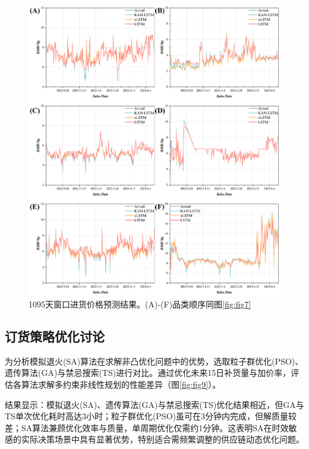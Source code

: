 \documentclass[lang=cn,12pt,a4paper]{elegantpaper}
\begin{document}
\begin{figure}[H]
    \centering
    \includegraphics[width=1\textwidth]{图片8.png}
    \caption{1095天窗口进货价格预测结果。(A)-(F)品类顺序同图\ref{fig:fig7}}
    \label{fig:fig8}
\end{figure}

\subsection{订货策略优化讨论}
\label{subsec:discussion_ordering_strategy}

为分析模拟退火(SA)算法在求解非凸优化问题中的优势，选取粒子群优化(PSO)、遗传算法(GA)与禁忌搜索(TS)进行对比\citep{Kennedy1995,Alhijawi2024,Niroumandrad2024}。通过优化未来15日补货量与加价率，评估各算法求解多约束非线性规划的性能差异（图\ref{fig:fig9}）。

结果显示：模拟退火(SA)、遗传算法(GA)与禁忌搜索(TS)优化结果相近，但GA与TS单次优化耗时高达3小时；粒子群优化(PSO)虽可在3分钟内完成，但解质量较差；SA算法兼顾优化效率与质量，单周期优化仅需约1分钟。这表明SA在时效敏感的实际决策场景中具有显著优势，特别适合需频繁调整的供应链动态优化问题。
\end{document}
